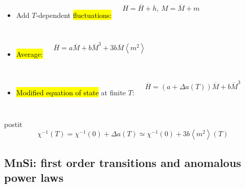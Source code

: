 \begin{frame}[label=BorderFM1]
\pause
\begin{minipage}{\textwidth}
\begin{columns}[b]
\begin{itemize}
  \item
    Add $T$-dependent \hl{fluctuations:} 
\end{itemize}
$H=\overline H + h$, $M = \overline M + m$
\end{columns}
\end{minipage}

\pause
\begin{minipage}{\textwidth}
\begin{columns}[b]
\begin{itemize}
  \item
    \hl{Average:}
\end{itemize}
$ \overline H = a \overline M + b \overline M^3 + 3b \overline M
    \left< m^2 \right> $
\end{columns}
\end{minipage}

\pause
\begin{minipage}{\textwidth}
\begin{columns}[b]
\begin{itemize}
  \item
    \hl{Modified equation of state} at finite $T$:
\end{itemize}
    $\overline H = \left( a + \Delta a(T) \right) \overline M + b \overline
    M^3 $ 
\end{columns}
\end{minipage}

\pause
\begin{beamercolorbox}{postit}
\[ \chi^{-1}(T) = \chi^{-1}(0) + \Delta a(T) \simeq \chi^{-1}(0) + 3 b \left<
    m^2 \right>(T) \]
\end{beamercolorbox}
 
\end{frame}



\subsection{MnSi: first order transitions and anomalous power laws}


